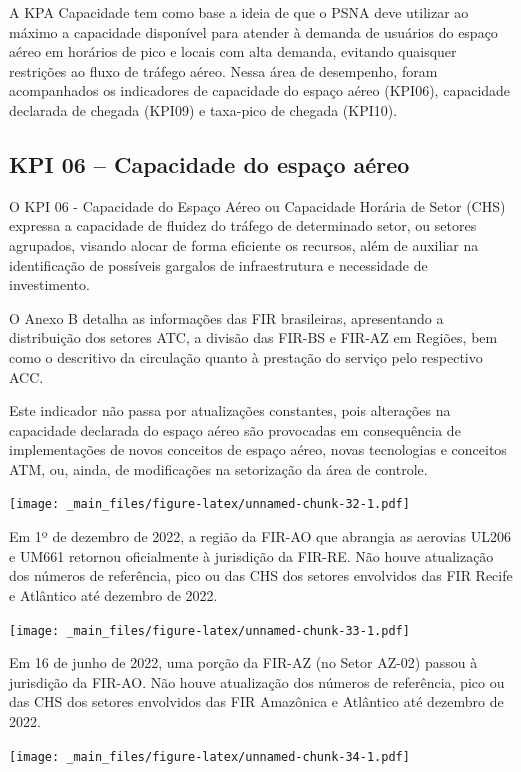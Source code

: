 \documentclass[
]{book}
\begin{document}
A KPA Capacidade tem como base a ideia de que o PSNA deve utilizar ao máximo a capacidade disponível para atender à demanda de usuários do espaço aéreo em horários de pico e locais com alta demanda, evitando quaisquer restrições ao fluxo de tráfego aéreo. Nessa área de desempenho, foram acompanhados os indicadores de capacidade do espaço aéreo (KPI06), capacidade declarada de chegada (KPI09) e taxa-pico de chegada (KPI10).

\hypertarget{kpi-06-capacidade-do-espauxe7o-auxe9reo}{%
\subsection{KPI 06 -- Capacidade do espaço aéreo}\label{kpi-06-capacidade-do-espauxe7o-auxe9reo}}

O KPI 06 - Capacidade do Espaço Aéreo ou Capacidade Horária de Setor (CHS) expressa a capacidade de fluidez do tráfego de determinado setor, ou setores agrupados, visando alocar de forma eficiente os recursos, além de auxiliar na identificação de possíveis gargalos de infraestrutura e necessidade de investimento.

O Anexo B detalha as informações das FIR brasileiras, apresentando a distribuição dos setores ATC, a divisão das FIR-BS e FIR-AZ em Regiões, bem como o descritivo da circulação quanto à prestação do serviço pelo respectivo ACC.

Este indicador não passa por atualizações constantes, pois alterações na capacidade declarada do espaço aéreo são provocadas em consequência de implementações de novos conceitos de espaço aéreo, novas tecnologias e conceitos ATM, ou, ainda, de modificações na setorização da área de controle.

\texttt{[image: \_main\_files/figure-latex/unnamed-chunk-32-1.pdf]}

Em 1º de dezembro de 2022, a região da FIR-AO que abrangia as aerovias UL206 e UM661 retornou oficialmente à jurisdição da FIR-RE. Não houve atualização dos números de referência, pico ou das CHS dos setores envolvidos das FIR Recife e Atlântico até dezembro de 2022.

\texttt{[image: \_main\_files/figure-latex/unnamed-chunk-33-1.pdf]}

Em 16 de junho de 2022, uma porção da FIR-AZ (no Setor AZ-02) passou à jurisdição da FIR-AO. Não houve atualização dos números de referência, pico ou das CHS dos setores envolvidos das FIR Amazônica e Atlântico até dezembro de 2022.

\texttt{[image: \_main\_files/figure-latex/unnamed-chunk-34-1.pdf]}
\end{document}
